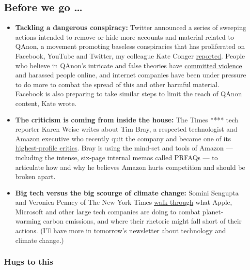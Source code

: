 \hypertarget{before-we-go-}{%
\subsection{Before we go \ldots{}}\label{before-we-go-}}

\begin{itemize}
\item
  \textbf{Tackling a dangerous conspiracy:} Twitter announced a series
  of sweeping actions intended to remove or hide more accounts and
  material related to QAnon, a movement promoting baseless conspiracies
  that has proliferated on Facebook, YouTube and Twitter, my colleague
  Kate Conger
  \href{https://www.nytimes3xbfgragh.onion/2020/07/21/technology/twitter-bans-qanon-accounts.html}{reported}.
  People who believe in QAnon's intricate and false theories have
  \href{https://www.nytimes3xbfgragh.onion/2020/02/09/us/politics/qanon-trump-conspiracy-theory.html}{committed
  violence} and harassed people online, and internet companies have been
  under pressure to do more to combat the spread of this and other
  harmful material. Facebook is also preparing to take similar steps to
  limit the reach of QAnon content, Kate wrote.
\item
  \textbf{The criticism is coming from inside the house:} The Times ****
  tech reporter Karen Weise writes about Tim Bray, a respected
  technologist and Amazon executive who recently quit the company and
  \href{https://www.nytimes3xbfgragh.onion/2020/07/22/technology/amazon-critic-tim-bray.html}{became
  one of its highest-profile critics}. Bray is using the mind-set and
  tools of Amazon --- including the intense, six-page internal memos
  called PRFAQs --- to articulate how and why he believes Amazon hurts
  competition and should be broken apart.
\item
  \textbf{Big tech versus the big scourge of climate change:} Somini
  Sengupta and Veronica Penney of The New York Times
  \href{https://www.nytimes3xbfgragh.onion/2020/07/21/climate/apple-emissions-pledge.html}{walk
  through} what Apple, Microsoft and other large tech companies are
  doing to combat planet-warming carbon emissions, and where their
  rhetoric might fall short of their actions. (I'll have more in
  tomorrow's newsletter about technology and climate change.)
\end{itemize}

\hypertarget{hugs-to-this}{%
\subsubsection{Hugs to this}\label{hugs-to-this}}

